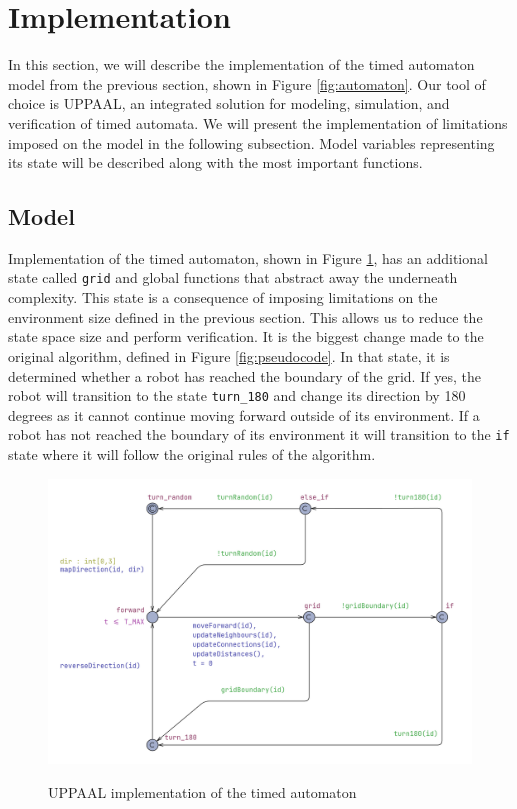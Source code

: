\section{Implementation}
In this section, we will describe the implementation of the timed automaton model from the previous section, shown in Figure \ref{fig:automaton}. Our tool of choice is UPPAAL, an integrated solution for modeling, simulation, and verification of timed automata. We will present the implementation of limitations imposed on the model in the following subsection.  Model variables representing its state will be described along with the most important functions.


\subsection{Model}
Implementation of the timed automaton, shown in Figure \ref{fig:implementation}, has an additional state called \texttt{grid} and global functions that abstract away the underneath complexity. This state is a consequence of imposing limitations on the environment size defined in the previous section. This allows us to reduce the state space size and perform verification. It is the biggest change made to the original algorithm, defined in Figure \ref{fig:pseudocode}. In that state, it is determined whether a robot has reached the boundary of the grid. If yes, the robot will transition to the state \texttt{turn\_180} and change its direction by 180 degrees as it cannot continue moving forward outside of its environment. If a robot has not reached the boundary of its environment it will transition to the \texttt{if} state where it will follow the original rules of the algorithm.

\begin{figure}[H]
\caption{UPPAAL implementation of the timed automaton}
\includegraphics[width=\textwidth]{images/implementation.png}
\label{fig:implementation}
\end{figure}




